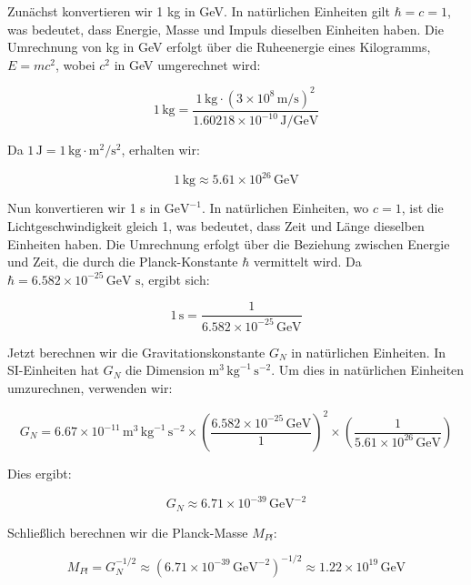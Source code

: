Zunächst konvertieren wir 1 kg in GeV. In natürlichen Einheiten gilt $\hbar = c = 1$, was bedeutet, dass Energie, Masse und Impuls dieselben Einheiten haben. Die Umrechnung von kg in GeV erfolgt über die Ruheenergie eines Kilogramms, $E = mc^2$, wobei $c^2$ in GeV umgerechnet wird:

\[
1 \, \text{kg} = \frac{1 \, \text{kg} \cdot (3 \times 10^8 \, \text{m/s})^2}{1.60218 \times 10^{-10} \, \text{J/GeV}}
\]

Da $1 \, \text{J} = 1 \, \text{kg} \cdot \text{m}^2/\text{s}^2$, erhalten wir:

\[
1 \, \text{kg} \approx 5.61 \times 10^{26} \, \text{GeV}
\]

Nun konvertieren wir 1 s in $\mathrm{GeV}^{-1}$. In natürlichen Einheiten, wo $c = 1$, ist die Lichtgeschwindigkeit gleich 1, was bedeutet, dass Zeit und Länge dieselben Einheiten haben. Die Umrechnung erfolgt über die Beziehung zwischen Energie und Zeit, die durch die Planck-Konstante $\hbar$ vermittelt wird. Da $\hbar = 6.582 \times 10^{-25} \, \text{GeV s}$, ergibt sich:

\[
1 \, \text{s} = \frac{1}{6.582 \times 10^{-25} \, \text{GeV}}
\]

Jetzt berechnen wir die Gravitationskonstante $G_N$ in natürlichen Einheiten. In SI-Einheiten hat $G_N$ die Dimension $\mathrm{m}^3 \, \mathrm{kg}^{-1} \, \mathrm{s}^{-2}$. Um dies in natürlichen Einheiten umzurechnen, verwenden wir:

\[
G_N = 6.67 \times 10^{-11} \, \mathrm{m}^3 \, \mathrm{kg}^{-1} \, \mathrm{s}^{-2} \times \left( \frac{6.582 \times 10^{-25} \, \text{GeV}}{1} \right)^2 \times \left( \frac{1}{5.61 \times 10^{26} \, \text{GeV}} \right)
\]

Dies ergibt:

\[
G_N \approx 6.71 \times 10^{-39} \, \text{GeV}^{-2}
\]

Schließlich berechnen wir die Planck-Masse $M_{Pl}$:

\[
M_{Pl} = G_N^{-1/2} \approx (6.71 \times 10^{-39} \, \text{GeV}^{-2})^{-1/2} \approx 1.22 \times 10^{19} \, \text{GeV}
\]
